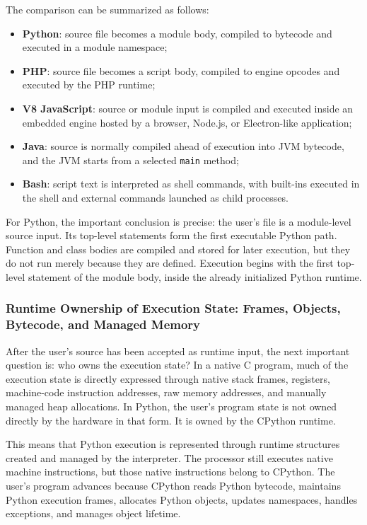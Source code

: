 \documentclass[a4paper,twoside]{report}
\begin{document}
The comparison can be summarized as follows:

\begin{itemize}
    \item \textbf{Python}: source file becomes a module body, compiled to bytecode and executed in a module namespace;
    \item \textbf{PHP}: source file becomes a script body, compiled to engine opcodes and executed by the PHP runtime;
    \item \textbf{V8 JavaScript}: source or module input is compiled and executed inside an embedded engine hosted by a browser, Node.js, or Electron-like application;
    \item \textbf{Java}: source is normally compiled ahead of execution into JVM bytecode, and the JVM starts from a selected \texttt{main} method;
    \item \textbf{Bash}: script text is interpreted as shell commands, with built-ins executed in the shell and external commands launched as child processes.
\end{itemize}

For Python, the important conclusion is precise: the user's file is a module-level source input. Its top-level statements form the first executable Python path. Function and class bodies are compiled and stored for later execution, but they do not run merely because they are defined. Execution begins with the first top-level statement of the module body, inside the already initialized Python runtime.



\subsubsection{Runtime Ownership of Execution State: Frames, Objects, Bytecode, and Managed Memory}

After the user's source has been accepted as runtime input, the next important question is: who owns the execution state? In a native C program, much of the execution state is directly expressed through native stack frames, registers, machine-code instruction addresses, raw memory addresses, and manually managed heap allocations. In Python, the user's program state is not owned directly by the hardware in that form. It is owned by the CPython runtime.

This means that Python execution is represented through runtime structures created and managed by the interpreter. The processor still executes native machine instructions, but those native instructions belong to CPython. The user's program advances because CPython reads Python bytecode, maintains Python execution frames, allocates Python objects, updates namespaces, handles exceptions, and manages object lifetime.
\end{document}
